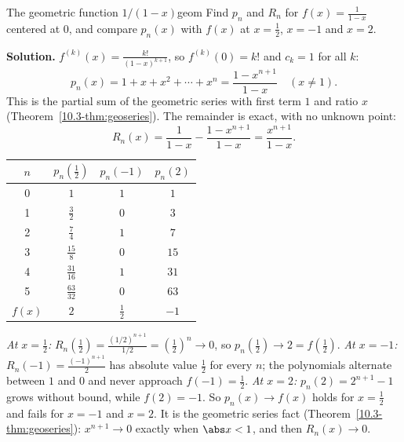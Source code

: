\documentclass[11pt]{article}
\begin{document}
\begin{exmp}{The geometric function $1/(1-x)$}{geom}
Find $p_n$ and $R_n$ for $f(x)=\frac1{1-x}$ centered at $0$, and compare $p_n(x)$ with $f(x)$ at $x=\frac12$, $x=-1$ and $x=2$.

\textbf{Solution.} $f^{(k)}(x)=\frac{k!}{(1-x)^{k+1}}$, so $f^{(k)}(0)=k!$ and $c_k=1$ for all $k$:
\[
p_n(x)=1+x+x^2+\cdots+x^n=\frac{1-x^{n+1}}{1-x}\quad(x\ne1).
\]
This is the partial sum of the geometric series with first term $1$ and ratio $x$ (Theorem~\ref{10.3-thm:geoseries}). The remainder is exact, with no unknown point:
\[
R_n(x)=\frac1{1-x}-\frac{1-x^{n+1}}{1-x}=\frac{x^{n+1}}{1-x}.
\]
\begin{center}
\begin{tabular}{@{}cccc@{}}\toprule
$n$ & $p_n(\frac12)$ & $p_n(-1)$ & $p_n(2)$\\\midrule
0 & $1$ & $1$ & $1$\\
1 & $\frac32$ & $0$ & $3$\\
2 & $\frac74$ & $1$ & $7$\\
3 & $\frac{15}8$ & $0$ & $15$\\
4 & $\frac{31}{16}$ & $1$ & $31$\\
5 & $\frac{63}{32}$ & $0$ & $63$\\\midrule
$f(x)$ & $2$ & $\frac12$ & $-1$\\\bottomrule
\end{tabular}
\end{center}
\emph{At $x=\frac12$:} $R_n(\frac12)=\frac{(1/2)^{n+1}}{1/2}=\left(\frac12\right)^n\to0$, so $p_n(\frac12)\to2=f(\frac12)$. \emph{At $x=-1$:} $R_n(-1)=\frac{(-1)^{n+1}}2$ has absolute value $\frac12$ for every $n$; the polynomials alternate between $1$ and $0$ and never approach $f(-1)=\frac12$. \emph{At $x=2$:} $p_n(2)=2^{n+1}-1$ grows without bound, while $f(2)=-1$. So $p_n(x)\to f(x)$ holds for $x=\frac12$ and fails for $x=-1$ and $x=2$. It is the geometric series fact (Theorem~\ref{10.3-thm:geoseries}): $x^{n+1}\to0$ exactly when $\abs x<1$, and then $R_n(x)\to0$.
\end{exmp}
\end{document}
